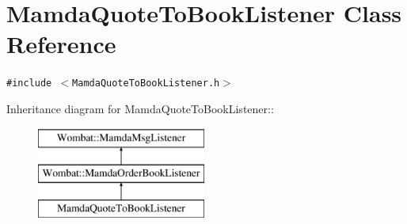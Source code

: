 \hypertarget{classMamdaQuoteToBookListener}{
\section{Mamda\-Quote\-To\-Book\-Listener Class Reference}
\label{classMamdaQuoteToBookListener}
}
{\tt \#include $<$Mamda\-Quote\-To\-Book\-Listener.h$>$}

Inheritance diagram for Mamda\-Quote\-To\-Book\-Listener::\begin{figure}[H]
\begin{center}
\leavevmode
\includegraphics[height=3cm]{classMamdaQuoteToBookListener}
\end{center}
\end{figure}
